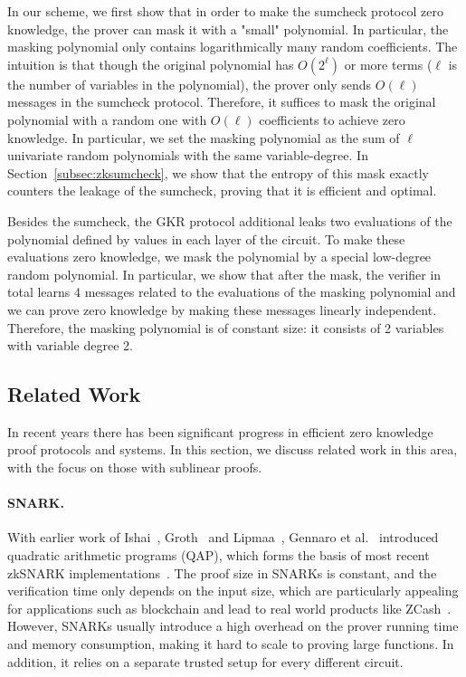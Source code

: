 In our scheme, we first show that in order to make the sumcheck protocol zero knowledge, the prover can mask it with a "small" polynomial. In particular, the masking polynomial only contains logarithmically many random coefficients. The intuition is that though the original polynomial has $O(2^\ell)$ or more terms ($\ell$ is the number of variables in the polynomial), the prover only sends $O(\ell)$ messages in the sumcheck protocol. Therefore, it suffices to mask the original polynomial with a random one with $O(\ell)$ coefficients to achieve zero knowledge. In particular, we set the masking polynomial as the sum of $\ell$ univariate random polynomials with the same variable-degree. In Section~\ref{subsec:zksumcheck}, we show that the entropy of this mask exactly counters the leakage of the sumcheck, proving that it is efficient and optimal.

Besides the sumcheck, the GKR protocol additional leaks two evaluations of the polynomial defined by values in each layer of the circuit. To make these evaluations zero knowledge, we mask the polynomial by a special low-degree random polynomial. In particular, we show that after the mask, the verifier in total learns 4 messages related to the evaluations of the masking polynomial and we can prove zero knowledge by making these messages linearly independent. Therefore, the masking polynomial is of constant size: it consists of 2 variables with variable degree 2.


\subsection{Related Work}\label{subsec::related}

 In recent years there has been significant progress in efficient zero knowledge proof protocols and systems. In this section, we discuss related work in this area, with the focus on those with sublinear proofs. 

\paragraph{SNARK.} With earlier work of Ishai~\cite{IshaiKO07}, Groth~\cite{Groth10} and Lipmaa~\cite{lipmaa2012progression}, Gennaro et al.~\cite{GGPR13} introduced quadratic arithmetic programs (QAP), which forms the basis of most recent zkSNARK implementations~\cite{parno2013pinocchio,ben2013snarks,braun13,libsnark,ben2014scalable,geppetto,DBLP:conf/eurocrypt/ChiesaTV15,wahby2015efficient,Fiore16,wu2018dizk}. The proof size in SNARKs is constant, and the verification time only depends on the input size, which are particularly appealing for applications such as blockchain and lead to real world products like ZCash~\cite{zerocash}. However, SNARKs usually introduce a high overhead on the prover running time and memory consumption, making it hard to scale to proving large functions. In addition, it relies on a separate trusted setup for every different circuit. 

